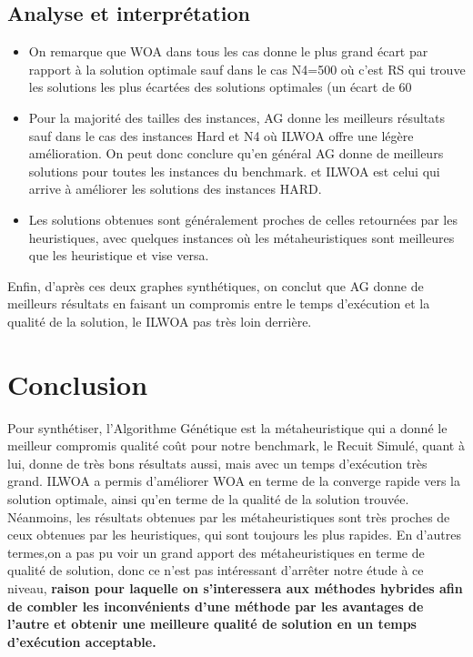 \documentclass[12pt]{article}
\begin{document}
        \subsection{Analyse et interprétation}
            \begin{itemize}
                \item On remarque que WOA dans tous les cas donne le plus grand écart par rapport à la solution optimale sauf dans le cas N4=500 où c’est RS qui trouve les solutions les plus écartées des solutions optimales (un écart de 60%
                \item Pour la majorité des tailles des instances, AG donne les meilleurs résultats sauf dans le cas des instances Hard et N4 où ILWOA offre une légère amélioration. On peut donc conclure qu'en général AG donne de meilleurs solutions pour toutes les instances du benchmark. et ILWOA est celui qui arrive à améliorer les solutions des instances HARD. 
                \item Les solutions obtenues sont généralement proches de celles retournées par les heuristiques, avec quelques instances où les métaheuristiques sont meilleures que les heuristique et vise versa.
            \end{itemize}
            Enfin, d’après ces deux graphes synthétiques, on conclut  que AG donne de meilleurs résultats en faisant un compromis entre le temps d'exécution et la qualité de la solution, le ILWOA pas très loin derrière.
    \section{Conclusion}
    Pour synthétiser, l’Algorithme Génétique est la métaheuristique qui a donné le meilleur compromis qualité coût pour notre benchmark, le Recuit Simulé, quant à lui, donne de très bons résultats aussi, mais avec un temps d'exécution très grand. ILWOA a permis d’améliorer WOA en terme de la converge rapide vers la solution optimale, ainsi qu’en terme de la qualité de la solution trouvée. Néanmoins, les résultats obtenues par les métaheuristiques sont très proches de ceux obtenues par les heuristiques, qui sont toujours les plus rapides. En d’autres termes,on a pas pu voir un grand apport des métaheuristiques en terme de qualité de solution, donc ce n’est pas intéressant d’arrêter notre étude à ce niveau, \textbf{raison pour laquelle on s’interessera aux méthodes hybrides afin de combler les inconvénients d’une méthode par les avantages de l’autre et obtenir une meilleure qualité de solution en un temps d'exécution acceptable.}
\end{document}
